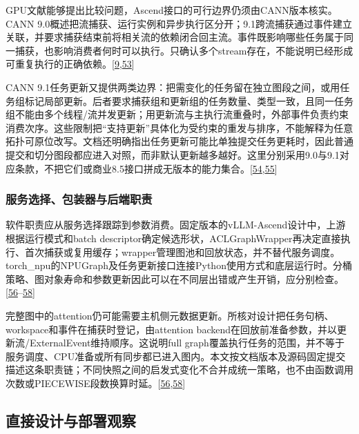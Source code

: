\documentclass[
  UTF8,
  zihao=5]{ctexart}
\begin{document}
GPU文献能够提出比较问题，Ascend接口的可行边界仍须由CANN版本核实。CANN
9.0概述把流捕获、运行实例和异步执行区分开；9.1跨流捕获通过事件建立关联，并要求捕获结束前将相关流的依赖闭合回主流。事件既影响哪些任务属于同一捕获，也影响消费者何时可以执行。只确认多个stream存在，不能说明已经形成可重复执行的正确依赖。{[}\protect\hyperlink{ref-cann900overview}{9},\protect\hyperlink{ref-cann910multi}{53}{]}

CANN
9.1任务更新又提供两类边界：把需变化的任务留在独立图段之间，或用任务组标记局部更新。后者要求捕获组和更新组的任务数量、类型一致，且同一任务组不能由多个线程/流并发更新；用更新流与主执行流重叠时，外部事件负责约束消费次序。这些限制把``支持更新''具体化为受约束的重发与排序，不能解释为任意拓扑可原位改写。文档还明确指出任务更新可能比单独提交任务更耗时，因此普通提交和切分图段都应进入对照，而非默认更新越多越好。这里分别采用9.0与9.1对应条款，不把它们或商业8.5接口拼成无版本的能力集合。{[}\protect\hyperlink{ref-cann910update}{54},\protect\hyperlink{ref-cann850updateapi}{55}{]}

\hypertarget{ux670dux52a1ux9009ux62e9ux5305ux88c5ux5668ux4e0eux540eux7aefux804cux8d23}{%
\subsubsection{服务选择、包装器与后端职责}\label{ux670dux52a1ux9009ux62e9ux5305ux88c5ux5668ux4e0eux540eux7aefux804cux8d23}}

软件职责应从服务选择跟踪到参数消费。固定版本的vLLM-Ascend设计中，上游根据运行模式和batch
descriptor确定候选形状，ACLGraphWrapper再决定直接执行、首次捕获或复用缓存；wrapper管理图池和回放状态，并不替代服务调度。torch\_npu的NPUGraph及任务更新接口连接Python使用方式和底层运行时。分桶策略、图对象寿命和参数更新因此可以在不同层出错或产生开销，应分别检查。{[}\protect\hyperlink{ref-vllmascenddesign}{56}--\protect\hyperlink{ref-vllmascend2026impl}{58}{]}

完整图中的attention仍可能需要主机侧元数据更新。所核对设计把任务句柄、workspace和事件在捕获时登记，由attention
backend在回放前准备参数，并以更新流/ExternalEvent维持顺序。这说明full
graph覆盖执行任务的范围，并不等于服务调度、CPU准备或所有同步都已进入图内。本文按文档版本及源码固定提交描述这条职责链；不同快照之间的启发式变化不合并成统一策略，也不由函数调用次数或PIECEWISE段数换算时延。{[}\protect\hyperlink{ref-vllmascenddesign}{56},\protect\hyperlink{ref-vllmascend2026impl}{58}{]}

\hypertarget{ux76f4ux63a5ux8bbeux8ba1ux4e0eux90e8ux7f72ux89c2ux5bdf}{%
\subsection{直接设计与部署观察}\label{ux76f4ux63a5ux8bbeux8ba1ux4e0eux90e8ux7f72ux89c2ux5bdf}}
\end{document}
